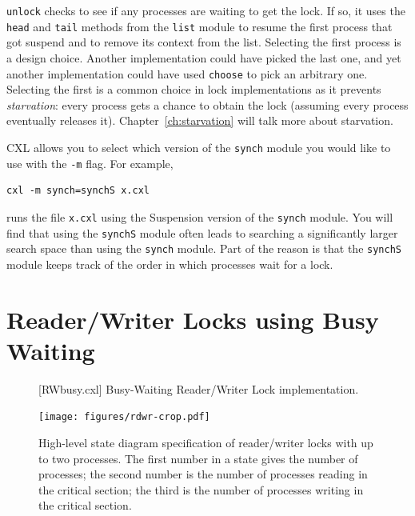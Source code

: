 \documentclass{report}
\newenvironment{code}{
\tcolorbox
}{
\endtcolorbox
}
\begin{document}
\texttt{unlock} checks to see if any processes are waiting to get the lock.
If so, it uses the \texttt{head} and \texttt{tail}
methods from the \texttt{list} module to resume the first process that got
suspend and to remove its context from the list.
Selecting the first process is a design choice.  Another implementation could
have picked the last one, and yet another implementation could have used
\texttt{choose} to pick an arbitrary one.  Selecting the first is a common
choice in lock implementations as it prevents \emph{starvation}: every process
gets a chance to obtain the lock (assuming every process eventually releases
it).  Chapter~\ref{ch:starvation} will talk more about starvation.

CXL allows you to select which version of the \texttt{synch} module you would
like to use with the \texttt{-m} flag.  For example,

\begin{code}
\begin{verbatim}
cxl -m synch=synchS x.cxl
\end{verbatim}
\end{code}

runs the file \texttt{x.cxl} using the Suspension version of the \texttt{synch} module.
You will find that using the \texttt{synchS} module often leads to searching a
significantly larger search space than using the \texttt{synch} module.
Part of the reason is that the \texttt{synchS} module keeps track of the order
in which processes wait for a lock.

\chapter{Reader/Writer Locks using Busy Waiting}

\begin{figure}
\begin{code}
\end{code}
\caption{[RWbusy.cxl] Busy-Waiting Reader/Writer Lock implementation.}
\label{fig:rwbusy}
\end{figure}

\begin{figure}
\begin{center}
\texttt{[image: figures/rdwr-crop.pdf]}
\end{center}
\caption{High-level state diagram specification of reader/writer locks with
up to two processes.
The first number in a state gives the number of processes; the second number is the
number of processes reading in the critical section; the third is the number of
processes writing in the critical section.}
\label{fig:rdwr}
\end{figure}
\end{document}
